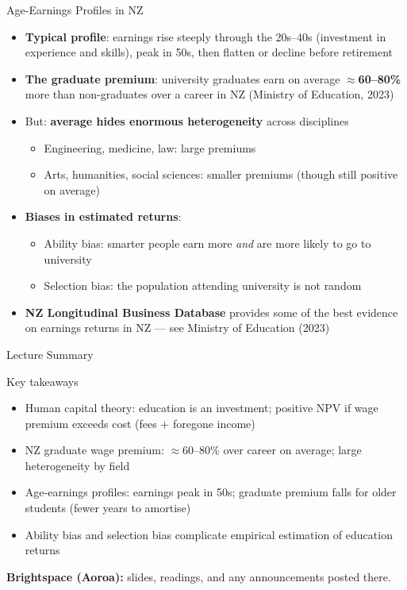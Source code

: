 \documentclass[aspectratio=169, 12pt]{beamer}
\newcommand{\summaryside}[1]{%
  \begin{frame}{Lecture Summary}
    \begin{exampleblock}{Key takeaways}
      \begin{itemize}#1\end{itemize}
    \end{exampleblock}
    \vspace{0.5em}
    {\footnotesize\textcolor{OtagoGold}{\textbf{Brightspace (Aoroa):}} slides, readings, and any announcements posted there.}
  \end{frame}}
\begin{document}
\begin{frame}{Age-Earnings Profiles in NZ}
  \begin{itemize}
    \item \textbf{Typical profile}: earnings rise steeply through the 20s--40s (investment in
          experience and skills), peak in 50s, then flatten or decline before retirement
    \item \textbf{The graduate premium}: university graduates earn on average \textbf{$\approx$60--80\%}
          more than non-graduates over a career in NZ (Ministry of Education, 2023)
    \item But: \textbf{average hides enormous heterogeneity} across disciplines
    \begin{itemize}
      \item Engineering, medicine, law: large premiums
      \item Arts, humanities, social sciences: smaller premiums (though still positive on average)
    \end{itemize}
    \item \textbf{Biases in estimated returns}:
    \begin{itemize}
      \item Ability bias: smarter people earn more \emph{and} are more likely to go to university
      \item Selection bias: the population attending university is not random
    \end{itemize}
    \item \textbf{NZ Longitudinal Business Database} provides some of the best evidence
          on earnings returns in NZ --- see Ministry of Education (2023)
  \end{itemize}
\end{frame}

\summaryside{
  \item Human capital theory: education is an investment; positive NPV if wage premium exceeds cost (fees + foregone income)
  \item NZ graduate wage premium: $\approx$60--80\% over career on average; large heterogeneity by field
  \item Age-earnings profiles: earnings peak in 50s; graduate premium falls for older students (fewer years to amortise)
  \item Ability bias and selection bias complicate empirical estimation of education returns
}

\end{document}
